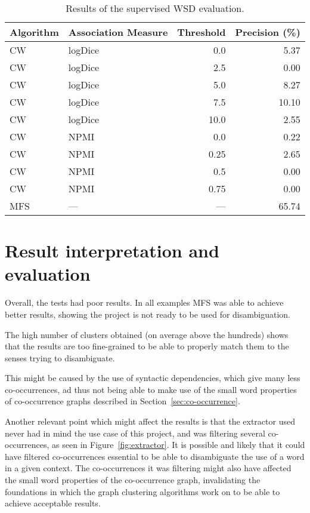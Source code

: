 \begin{table}[ht]
\caption{Results of the supervised \ac*{WSD} evaluation.}
\label{tab:sup-results}
\begin{tabu} to \textwidth {Xlrr}
\hline
\textbf{Algorithm} & \textbf{Association Measure} & \textbf{Threshold} & \textbf{Precision (\%)} \\
\hline
\ac{CW} & logDice   &  0.0 &  5.37 \\
\ac{CW} & logDice   &  2.5 &  0.00 \\
\ac{CW} & logDice   &  5.0 &  8.27 \\
\ac{CW} & logDice   &  7.5 & 10.10 \\
\ac{CW} & logDice   & 10.0 &  2.55 \\
\hline
\ac{CW} & \ac{NPMI} & 0.0  &  0.22 \\
\ac{CW} & \ac{NPMI} & 0.25 &  2.65 \\
\ac{CW} & \ac{NPMI} & 0.5  &  0.00 \\
\ac{CW} & \ac{NPMI} & 0.75 &  0.00 \\
\hline
\ac{MFS} & ---      &  --- & 65.74 \\
\hline
\end{tabu}
\end{table}

\section{Result interpretation and evaluation}

Overall, the tests had poor results. In all examples \ac{MFS} was able to
achieve better results, showing the project is not ready to be used for
disambiguation.

The high number of clusters obtained (on average above the hundreds) shows that
the results are too fine-grained to be able to properly match them to the senses
trying to disambiguate.

This might be caused by the use of syntactic dependencies, which give many less
co-occurrences, ad thus not being able to make use of the small word properties
of co-occurrence graphs described in Section~\ref{sec:co-occurrence}.

Another relevant point which might affect the results is that the extractor used
\citep{correia2015syntax} never had in mind the use case of this project, and 
was
filtering several co-occurrences, as seen in Figure~\ref{fig:extractor}. It is
possible and likely that it could have filtered co-occurrences essential to be
able to disambiguate the use of a word in a given context. The co-occurrences
it was filtering might also have affected the small word properties of the
co-occurrence graph, invalidating the foundations in which the graph clustering
algorithms work on to be able to achieve acceptable results.

